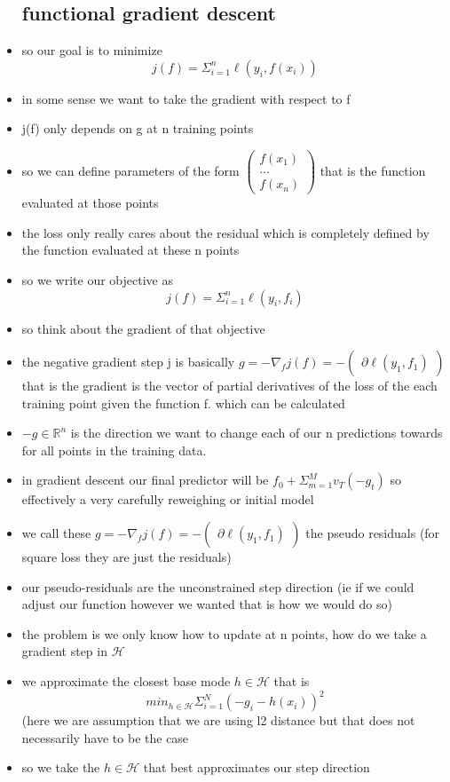 \documentclass{article}
\begin{document}
\begin{itemize}
\subsection{functional gradient descent }
\item so our goal is to minimize $$j(f)=\Sigma_{i=1}^{n}\ell(y_i,f(x_i))$$
\item in some sense we want to take the gradient with respect to f 
\item j(f) only depends on g at n training points 
\item so we can define parameters of the form $\begin{pmatrix}
f(x_1)\\...\\f(x_n)
\end{pmatrix}$ that is the function evaluated at those points
\item the loss only really cares about the residual which is completely defined by the function evaluated at these n points
\item so we write our objective as $$j(f)=\Sigma_{i=1}^{n}\ell(y_i,f_i)$$
\item so think about the gradient of that objective 
\item the negative gradient step j is basically $g=-\nabla_{f}j(f)=-\begin{pmatrix}
\partial \ell(y_1,f_1)    
\end{pmatrix}$ that is the gradient is the vector of partial derivatives of the loss of the each training point given the function f. which can be calculated
\item $-g\in \mathbb{R}^{n}$ is the direction we want to change each of our n predictions towards for all points in the training data. 
\item in gradient descent  our final predictor will be $f_{0}+\Sigma_{m=1}^{M}v_T(-g_t)$ so effectively a very carefully reweighing or initial model 
\item we call these $g=-\nabla_{f}j(f)=-\begin{pmatrix}
\partial \ell(y_1,f_1)    
\end{pmatrix}$
the pseudo residuals (for square loss they are just the residuals)
\item our pseudo-residuals are the unconstrained step direction (ie if we could adjust our function however we wanted that is how we would do so)
\item the problem is we only know how to update at n points, how do we take a gradient step in $\mathcal{H}$
\item we approximate the closest base mode $h\in \mathcal{H}$ that is $$min_{h\in \mathcal{H}}\Sigma_{i=1}^{N}(-g_{i}-h(x_i))^2$$ (here we are assumption that we are using l2 distance but that does not necessarily have to be the case 
\item so we take the $h\in \mathcal{H}$ that best approximates our step direction

\end{itemize}
\end{document}
